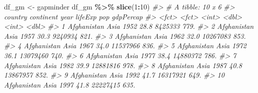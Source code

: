 \documentclass[
  xelatex, ja=standard]{bxjsbook}
\newenvironment{Shaded}{\begin{snugshade}}{\end{snugshade}}
\newcommand{\CommentTok}[1]{\textcolor[rgb]{0.56,0.35,0.01}{\textit{#1}}}
\newcommand{\DecValTok}[1]{\textcolor[rgb]{0.00,0.00,0.81}{#1}}
\newcommand{\FunctionTok}[1]{\textcolor[rgb]{0.13,0.29,0.53}{\textbf{#1}}}
\newcommand{\NormalTok}[1]{#1}
\newcommand{\OtherTok}[1]{\textcolor[rgb]{0.56,0.35,0.01}{#1}}
\newcommand{\SpecialCharTok}[1]{\textcolor[rgb]{0.81,0.36,0.00}{\textbf{#1}}}
\theoremstyle{definition}
\theoremstyle{definition}
\theoremstyle{definition}
\theoremstyle{definition}
\theoremstyle{remark}
\begin{document}
\begin{Shaded}
\begin{Highlighting}[]
\NormalTok{df\_gm }\OtherTok{\textless{}{-}}\NormalTok{ gapminder}
\NormalTok{df\_gm }\SpecialCharTok{\%\textgreater{}\%} \FunctionTok{slice}\NormalTok{(}\DecValTok{1}\SpecialCharTok{:}\DecValTok{10}\NormalTok{)}
\CommentTok{\#\textgreater{} \# A tibble: 10 x 6}
\CommentTok{\#\textgreater{}    country     continent  year lifeExp      pop gdpPercap}
\CommentTok{\#\textgreater{}    \textless{}fct\textgreater{}       \textless{}fct\textgreater{}     \textless{}int\textgreater{}   \textless{}dbl\textgreater{}    \textless{}int\textgreater{}     \textless{}dbl\textgreater{}}
\CommentTok{\#\textgreater{}  1 Afghanistan Asia       1952    28.8  8425333      779.}
\CommentTok{\#\textgreater{}  2 Afghanistan Asia       1957    30.3  9240934      821.}
\CommentTok{\#\textgreater{}  3 Afghanistan Asia       1962    32.0 10267083      853.}
\CommentTok{\#\textgreater{}  4 Afghanistan Asia       1967    34.0 11537966      836.}
\CommentTok{\#\textgreater{}  5 Afghanistan Asia       1972    36.1 13079460      740.}
\CommentTok{\#\textgreater{}  6 Afghanistan Asia       1977    38.4 14880372      786.}
\CommentTok{\#\textgreater{}  7 Afghanistan Asia       1982    39.9 12881816      978.}
\CommentTok{\#\textgreater{}  8 Afghanistan Asia       1987    40.8 13867957      852.}
\CommentTok{\#\textgreater{}  9 Afghanistan Asia       1992    41.7 16317921      649.}
\CommentTok{\#\textgreater{} 10 Afghanistan Asia       1997    41.8 22227415      635.}
\end{Highlighting}
\end{Shaded}

\begin{Shaded}
\end{Shaded}
\end{document}
